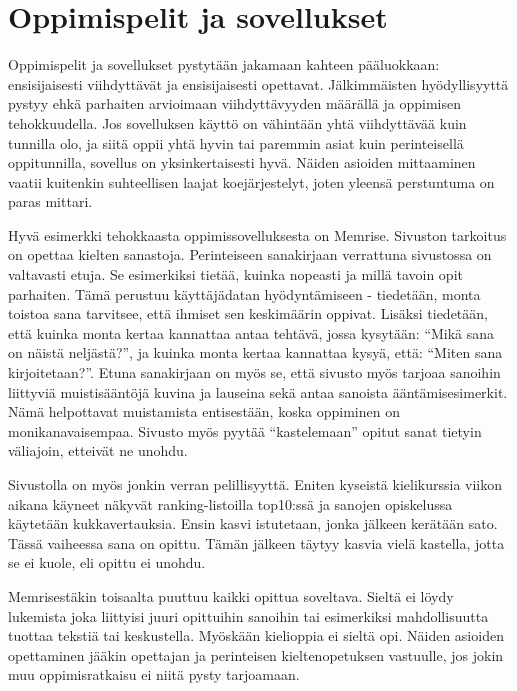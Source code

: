 \documentclass[utf8,bachelor]{gradu3}
\begin{document}




\section{Oppimispelit ja sovellukset}
Oppimispelit ja sovellukset pystytään jakamaan kahteen pääluokkaan: ensisijaisesti viihdyttävät ja ensisijaisesti opettavat. Jälkimmäisten hyödyllisyyttä pystyy ehkä parhaiten arvioimaan viihdyttävyyden määrällä ja oppimisen tehokkuudella. Jos sovelluksen käyttö on vähintään yhtä viihdyttävää kuin tunnilla olo, ja siitä oppii yhtä hyvin tai paremmin asiat kuin perinteisellä oppitunnilla, sovellus on yksinkertaisesti hyvä. Näiden asioiden mittaaminen vaatii kuitenkin suhteellisen laajat koejärjestelyt, joten yleensä perstuntuma on paras mittari.

Hyvä esimerkki tehokkaasta oppimissovelluksesta on Memrise.\parencite[][]{memrise} Sivuston tarkoitus on opettaa kielten sanastoja. Perinteiseen sanakirjaan verrattuna sivustossa on valtavasti etuja. Se esimerkiksi tietää, kuinka nopeasti ja millä tavoin opit parhaiten. Tämä perustuu käyttäjädatan hyödyntämiseen - tiedetään, monta toistoa sana tarvitsee, että ihmiset sen keskimäärin oppivat. Lisäksi tiedetään, että kuinka monta kertaa kannattaa antaa tehtävä, jossa kysytään: “Mikä sana on näistä neljästä?”, ja kuinka monta kertaa kannattaa kysyä, että: “Miten sana kirjoitetaan?”. Etuna sanakirjaan on myös se, että sivusto myös tarjoaa sanoihin liittyviä muistisääntöjä kuvina ja lauseina sekä antaa sanoista ääntämisesimerkit. Nämä helpottavat muistamista entisestään, koska oppiminen on monikanavaisempaa. Sivusto myös pyytää “kastelemaan” opitut sanat tietyin väliajoin, etteivät ne unohdu.

Sivustolla on myös jonkin verran pelillisyyttä. Eniten kyseistä kielikurssia viikon aikana käyneet näkyvät ranking-listoilla top10:ssä ja sanojen opiskelussa käytetään kukkavertauksia. Ensin kasvi istutetaan, jonka jälkeen kerätään sato. Tässä vaiheessa sana on opittu. Tämän jälkeen täytyy kasvia vielä kastella, jotta se ei kuole, eli opittu ei unohdu. 

Memrisestäkin toisaalta puuttuu kaikki opittua soveltava. Sieltä ei löydy lukemista joka liittyisi juuri opittuihin sanoihin tai esimerkiksi mahdollisuutta tuottaa tekstiä tai keskustella. Myöskään kielioppia ei sieltä opi. Näiden asioiden opettaminen jääkin opettajan ja perinteisen kieltenopetuksen vastuulle, jos jokin muu oppimisratkaisu ei niitä pysty tarjoamaan.
\end{document}
